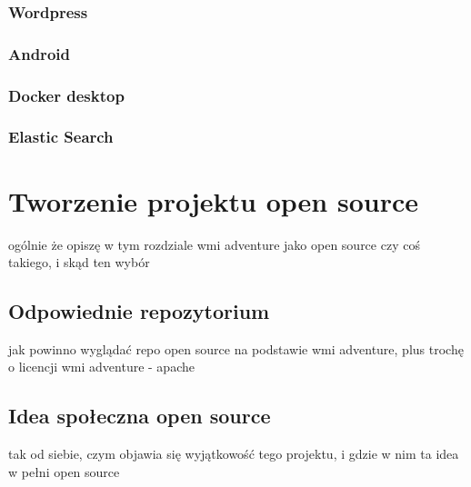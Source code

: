 \documentclass{article}
\begin{document}
\subsubsection{Wordpress}

\subsubsection{Android}

\subsubsection{Docker desktop}

\subsubsection{Elastic Search}

\section{Tworzenie projektu open source}

ogólnie że opiszę w tym rozdziale wmi adventure jako open source czy coś takiego, i skąd ten wybór

\subsection{Odpowiednie repozytorium}

jak powinno wyglądać repo open source na podstawie wmi adventure, plus trochę o licencji wmi adventure - apache

\subsection{Idea społeczna open source}

tak od siebie, czym objawia się wyjątkowość tego projektu, i gdzie w nim ta idea w pełni open source
\end{document}
